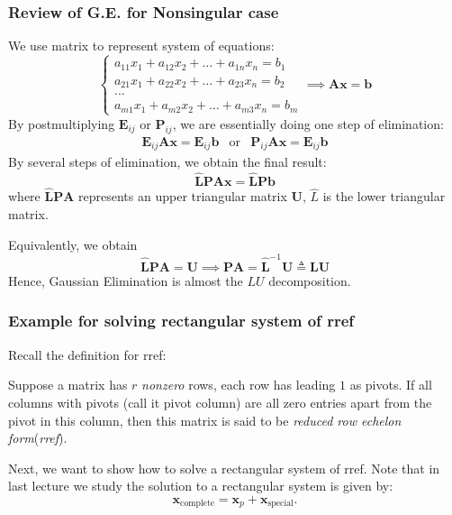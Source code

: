 \subsubsection{
Review of G.E. for Nonsingular case
}
We use matrix to represent system of equations: 
\[
\begin{cases}
a_{11}x_1 + a_{12}x_2 + \dots + a_{1n}x_n = b_1 \\ 
a_{21}x_1 + a_{22}x_2 + \dots + a_{23}x_n = b_2  \\
\dots 	 	\\
a_{m1}x_1 + a_{m2}x_2 + \dots + a_{m3}x_n = b_m  
\end{cases}
\implies
\bm{Ax} = \bm b\]
By postmultiplying $\bm E_{ij}$ or $\bm P_{ij}$, we are essentially doing one step of elimination:
\[
\begin{array}{lll}
\bm E_{ij}\bm A\bm x = \bm E_{ij}\bm b
&
\mbox{or}
&
\bm P_{ij}\bm A\bm x = \bm E_{ij}\bm b
\end{array}
\]
By several steps of elimination, we obtain the final result:
\[
\bm{\hat LPAx} = \bm{\hat LP}\bm b
\]
where $\bm{\hat LPA}$ represents an upper triangular matrix $\bm U$, $\hat L$ is the lower triangular matrix.

 Equivalently, we obtain
\[
\bm{\hat LPA} = \bm U\implies
\bm{PA} = \bm{\hat L}^{-1}\bm U\triangleq\bm{LU}
\]
Hence, Gaussian Elimination is almost the $LU$ decomposition.

\subsubsection{Example for solving rectangular system of rref}
Recall the definition for rref:
\begin{definition}
Suppose a matrix has $r$ \textit{nonzero} rows, each row has leading $1$ as pivots. If all columns with pivots (call it pivot column) are all zero entries apart from the pivot in this column, then this matrix is said to be \emph{reduced row echelon form}(\emph{rref}).
\end{definition}
Next, we want to show how to solve a rectangular system of rref. Note that in last lecture we study the solution to a rectangular system  is given by:
\[
\bm x_{\text{complete}} =\bm x_p +\bm x_{\text{special}}.
\]

